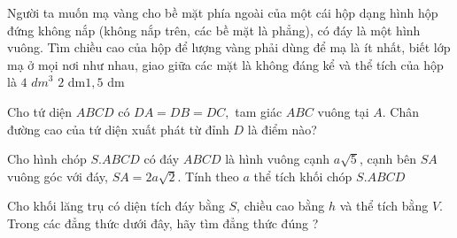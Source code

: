 \begin{ex}%
	Người ta muốn mạ vàng cho bề mặt phía ngoài của một cái hộp dạng hình hộp đứng không nắp (không nắp trên, các bề mặt là phẳng), có đáy là một hình vuông. Tìm chiều cao của hộp để lượng vàng phải dùng để mạ là ít nhất, biết lớp mạ ở mọi nơi như nhau, giao giữa các mặt là không đáng kể và thể tích của hộp là $4$ $\textit{dm}^3$
	 {$2$ dm}{$1,5$ dm}
\end{ex}
\begin{ex}%
	Cho tứ diện $ABCD$ có $DA=DB=DC,$ tam giác $ABC$ vuông tại $A$. Chân đường cao của tứ diện xuất phát từ đỉnh $D$ là điểm nào?
\end{ex}
\begin{ex}%
	Cho hình chóp $S.ABCD$ có đáy $ABCD$ là hình vuông cạnh $a\sqrt{5}$, cạnh bên $SA$ vuông góc với đáy, $SA=2a\sqrt{2}$. Tính theo $a$ thể tích khối chóp $S.ABCD$
\end{ex}
\begin{ex}%
	Cho khối lăng trụ có diện tích đáy bằng $S$, chiều cao bằng $h$ và thể tích bằng $V$. Trong các đẳng thức dưới đây, hãy tìm đẳng thức đúng ?
\end{ex}
